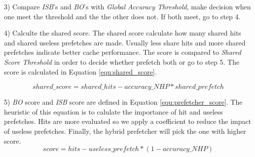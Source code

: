   3) Compare \emph{ISB}'s and \emph{BO}'s with \emph{Global Accuracy Threshold}, make decision when one meet the threshold and the the other does not. If both meet, go to step 4.

  4) Calculte the shared score. The shared score calculate how many shared hits and shared useless prefetches are made. Usually less share hits and more shared prefetches indicate better cache performance. The score is compared to \emph{Shared Score Threshold} in order to decide whether prefetch both or go to step 5. The score is calculated in Equation \ref{equ:shared_score}.

  \begin{equation}
  \label{equ:shared_score}
  shared\_score = shared\_hits - accuracy\_NHP * shared\_prefetch
  \end{equation}

  5) \emph{BO} score and \emph{ISB} score are defined in Equation \ref{equ:prefetcher_score}. The heuristic of this equation is to calulate the importance of hit and useless prefetches. Hits are more evaluated so we apply a coefficient to reduce the impact of useless prefetches. Finally, the hybrid prefetcher will pick the one with higher score.
  \begin{equation}
  \label{equ:prefetcher_score}
  score = hits - useless\_prefetch * (1 - accuracy\_NHP)
  \end{equation}

